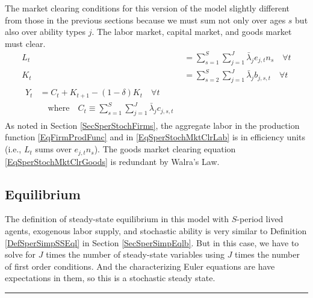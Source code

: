 \documentclass[letterpaper,12pt]{article}
\theoremstyle{definition}
\numberwithin{equation}{section}
\numberwithin{exercise}{section}
\begin{document}
\begin{spacing}{1.5}
      The market clearing conditions for this version of the model slightly different from those in the previous sections because we must sum not only over ages $s$ but also over ability types $j$. The labor market, capital market, and goods market must clear.
      \begin{align}
         L_t &= \sum_{s=1}^{S}\sum_{j=1}^{J} \bar{\lambda}_{j}e_{j,t}n_{s} \quad \forall t \label{EqSperStochMktClrLab} \\
         K_t &= \sum_{s=2}^{S}\sum_{j=1}^{J}\bar{\lambda}_{j}b_{j,s,t}  \quad \forall t \label{EqSperStochMktClrCap} \\
         \begin{split}
            Y_t &= C_t + K_{t+1} - (1-\delta)K_t \quad\forall t \\
            &\quad\text{where}\quad C_t \equiv \sum_{s=1}^{S}\sum_{j=1}^{J}\bar{\lambda}_{j}c_{j,s,t}
         \end{split} \label{EqSperStochMktClrGoods}
      \end{align}
      As noted in Section \ref{SecSperStochFirms}, the aggregate labor in the production function \eqref{EqFirmProdFunc} and in \eqref{EqSperStochMktClrLab} is in efficiency units (i.e., $L_t$ sums over $e_{j,t}n_{s}$). The goods market clearing equation \eqref{EqSperStochMktClrGoods} is redundant by Walra's Law.


   \subsection{Equilibrium}\label{SecSperStochEqlb}

      The definition of steady-state equilibrium in this model with $S$-period lived agents, exogenous labor supply, and stochastic ability is very similar to Definition \ref{DefSperSimpSSEql} in Section \ref{SecSperSimpEqlb}. But in this case, we have to solve for $J$ times the number of steady-state variables using $J$ times the number of first order conditions. And the characterizing Euler equations are have expectations in them, so this is a stochastic steady state.

      \end{spacing}
      \vspace{5mm}
      \hrule
      \vspace{-1mm}
\end{document}
